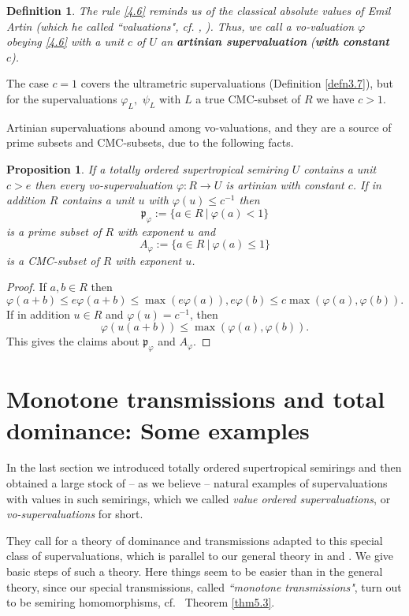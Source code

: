 \documentclass [12pt,a4paper,reqno]{amsart}
\newtheorem{prop}[thm]{Proposition}
\newtheorem{defn}[thm]{Definition}
\begin{document}
\begin{defn}\label{defn4.18} The rule \eqref{4.6} reminds us of
the classical absolute values of Emil Artin (which he called
``valuations", cf. \cite[Chapter 1]{A1},  \cite[Chapter 3]{A2}).
Thus, we call a vo-valuation $\varphi$ obeying  \eqref{4.6} with a
unit $c$ of $U$ an {\textbf{{artinian supervaluation}}} (\textbf{with
constant} ~$c$).\end{defn}

The case $c=1$ covers the ultrametric supervaluations (Definition
\ref{defn3.7}), but for the supervaluations $\varphi_L,$ $\psi_L$
with $L$ a true CMC-subset of $R$ we have $c>1.$

Artinian supervaluations abound among {vo}-valuations, and they are
a source of prime subsets and CMC-subsets, due to the following
facts.
\begin{prop}\label{prop4.22} If a totally ordered supertropical
semiring $U$ contains a unit $c > e$ then every {vo}-supervaluation
${\varphi}: R \to U$ is artinian with constant $c$. If in addition $R$
contains a unit $u$ with ${\varphi}(u) \leq c^{-1}$ then
$$ {\mathfrak p}_{\varphi} := \{ a \in R {\ {|} \ } {\varphi}(a) < 1 \} $$
is a prime subset of $R$ with exponent $u$ and
$$ A_{\varphi} := \{ a \in R {\ {|} \ } {\varphi}(a) \leq 1 \} $$
is a CMC-subset of $R$ with exponent $u$.
\end{prop}

\begin{proof} If  $a,b \in R$ then
$$ {\varphi} (a+b) \leq e {\varphi}(a+b) \leq \max (e {\varphi} (a)), e {\varphi} (b) \leq c \max ( {\varphi}(a), {\varphi}(b)).$$
If in addition $u \in R$ and  ${\varphi}(u) = c^{-1}$, then
$$ {\varphi} (u(a+b)) \leq \max ({\varphi}(a), {\varphi} (b)).$$
This gives the claims about  ${\mathfrak p}_{\varphi}$ and $A_{\varphi}$.
\end{proof}

\section{Monotone transmissions and total dominance: Some examples}\label{sec:5}
In the last section we introduced totally ordered supertropical
semirings and then obtained  a large stock of --  as we believe --
natural examples of supervaluations with values in such semirings,
which we called \emph{value ordered supervaluations}, or
\emph{{vo}-supervaluations} for short.

They call for a theory of dominance and transmissions adapted to
this special class of supervaluations, which is parallel to our
general theory in \cite{IKR1} and \cite{IKR2}. We give basic steps
of such a theory. Here things seem to be easier than  in the
general theory, since our special transmissions, called
\emph{``monotone transmissions"}, turn out to be semiring
homomorphisms, cf.~ Theorem \ref{thm5.3}.
\end{document}
